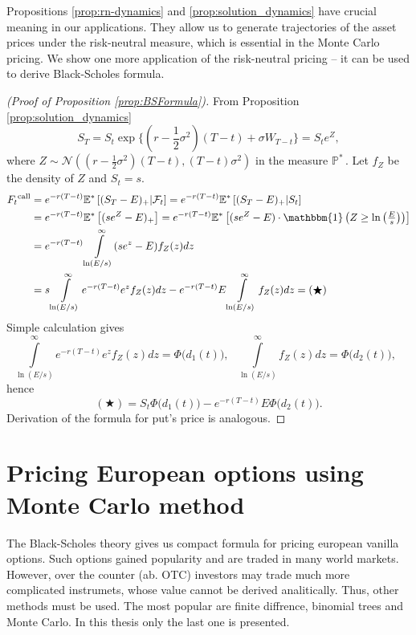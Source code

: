 \documentclass[a4paper,11pt, twoside]{book}
\theoremstyle{definition}
\theoremstyle{remark}
\def\Em{{\mathbb{E}^*}}
\def\Pm{{\mathbb{P}}^*\,}
\begin{document}
Propositions \ref{prop:rn-dynamics} and \ref{prop:solution_dynamics} have crucial meaning in our applications. They allow us to generate trajectories of the asset prices under the risk-neutral measure, which is essential in the Monte Carlo pricing. We show one more application of the risk-neutral pricing -- it can be used to derive Black-Scholes formula.
\begin{proof}[(Proof of Proposition \ref{prop:BSFormula})]
 From Proposition \ref{prop:solution_dynamics}
 \[ S_T = S_t \exp\bigl\{ (r - \frac{1}{2} \sigma^2)(T-t) + \sigma W_{T-t} \bigr\} = S_t e^Z, \]
 where $Z \sim \mathcal{N}\left((r - \frac{1}{2} \sigma^2)(T-t), (T-t)\sigma^2 \right)$ in the measure $\Pm$. Let $f_Z$ be the density of $Z$ and $S_t = s$.
 \begin{equation*}
  \begin{split}
    F_t\textsuperscript{call} &= e^{-r(T-t)} \Em\left[(S_T-E)_+ | \mathcal{F}_t \right] = e^{-r(T-t)} \Em\left[(S_T-E)_+ |S_t\right] \\
    &= e^{-r(T-t)} \Em\left[(s e^Z-E)_+ \right] = e^{-r(T-t)} \Em\left[(s e^Z-E) \cdot \mathbbm{1}\left({\textstyle Z \geq \ln\left(\frac{E}{s}\right)} \right) \right] \\
    &= e^{-r(T-t)} \int\limits_{\ln(E/s)}^\infty (se^z - E)f_Z(z) dz \\
    &= s\int\limits_{\ln(E/s)}^\infty e^{-r(T-t)}e^z f_Z(z) dz - e^{-r(T-t)} E\int\limits_{\ln(E/s)}^\infty f_Z(z) dz = (\bigstar)
  \end{split}
 \end{equation*}
 Simple calculation gives
 \[ \int\limits_{\ln(E/s)}^\infty e^{-r(T-t)}e^z f_Z(z) dz = \Phi\bigl( d_1(t) \bigr),  \ \ \ 
    \int\limits_{\ln(E/s)}^\infty f_Z(z) dz = \Phi\bigl( d_2(t) \bigr),  \ \ \ \]
 hence 
 \[ (\bigstar) = S_t \Phi\bigl( d_1(t) \bigr)  - e^{-r(T-t)} E \Phi\bigl( d_2(t) \bigr) . \]
 Derivation of the formula for put's price is analogous.
\end{proof}




\chapter[{Pricing European options using Monte Carlo method}]{Pricing European options using \\Monte Carlo method}
The Black-Scholes theory gives us compact formula for pricing european vanilla options. Such options gained popularity and are traded in many world markets. However, over the counter (ab. OTC) investors may trade much more complicated instrumets, whose value cannot be derived analitically. Thus, other methods must be used.
The most popular are finite diffrence, binomial trees and Monte Carlo. In this thesis only the last one is presented.
\end{document}
